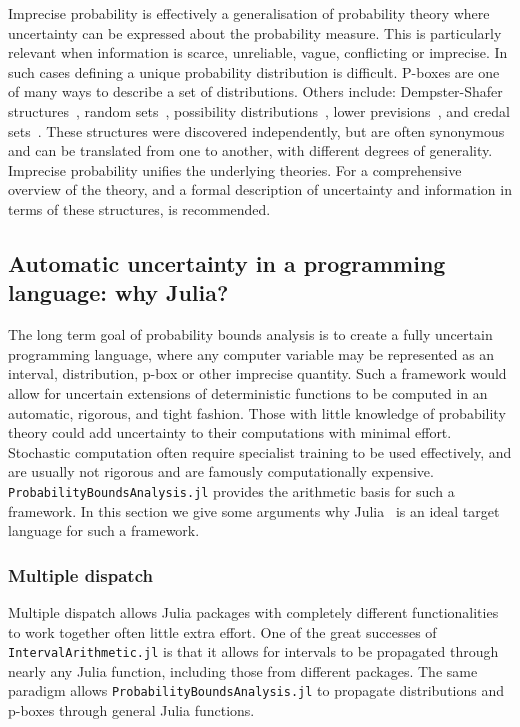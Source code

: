 \documentclass{juliacon}
\begin{document}
Imprecise probability is effectively a generalisation of probability theory where uncertainty can be expressed about the probability measure. This is particularly relevant when information is scarce, unreliable, vague, conflicting or imprecise. In such cases defining a unique probability distribution is difficult. P-boxes are one of many ways to describe a set of distributions. Others include: Dempster-Shafer structures~\cite{dempster2008upper,shafer1976mathematical}, random sets~\cite{molchanov2005theory}, possibility distributions~\cite{zadeh1978fuzzy,dubois1988possibility, hose2019possibilistic}, lower previsions~\cite{troffaes2014lower}, and credal sets~\cite{levi1983enterprise}. These structures were discovered independently, but are often synonymous and can be translated from one to another, with different degrees of generality. Imprecise probability unifies the underlying theories. For a comprehensive overview of the theory, and a formal description of uncertainty and information in terms of these structures, \cite{klir2013uncertainty} is recommended.
\subsection{Automatic uncertainty in a programming language: why Julia?}
The long term goal of probability bounds analysis is to create a fully uncertain programming language, where any computer variable may be represented as an interval, distribution, p-box or other imprecise quantity. Such a framework would allow for uncertain extensions of deterministic functions to be computed in an automatic, rigorous, and tight fashion. Those with little knowledge of probability theory could add uncertainty to their computations with minimal effort. Stochastic computation often require specialist training to be used effectively, and are usually not rigorous and are famously computationally expensive. \texttt{ProbabilityBoundsAnalysis.jl} provides the arithmetic basis for such a framework. In this section we give some arguments why Julia~\cite{bezanson2017julia} is an ideal target language for such a framework.

\subsubsection{Multiple dispatch}
Multiple dispatch allows Julia packages with completely different functionalities to work together often little extra effort. One of the great successes of \texttt{IntervalArithmetic.jl} is that it allows for intervals to be propagated through nearly any Julia function, including those from different packages. The same paradigm allows \texttt{ProbabilityBoundsAnalysis.jl} to propagate distributions and p-boxes through general Julia functions.
\end{document}
